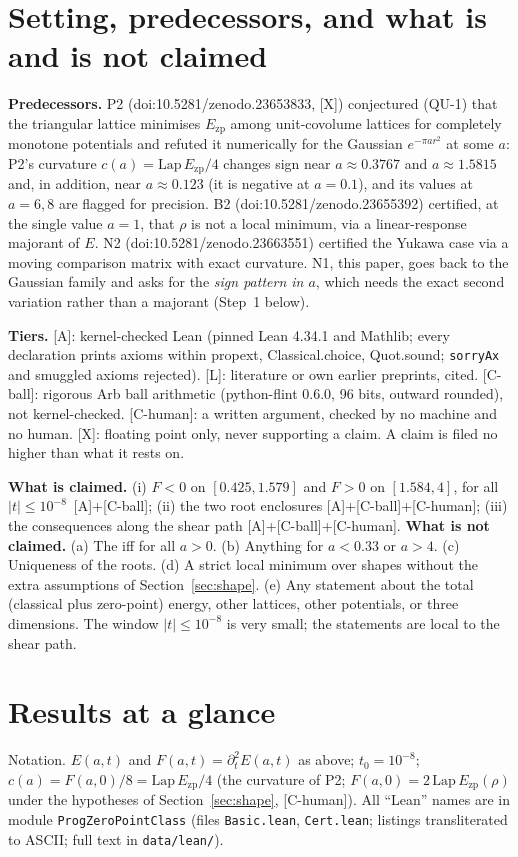 \documentclass[10pt]{article}
\newcommand{\tier}[1]{\textsf{[#1]}}
\newcommand{\tA}{\tier{A}}
\newcommand{\tL}{\tier{L}}
\newcommand{\tX}{\tier{X}}
\newcommand{\tCh}{\tier{C-human}}
\newcommand{\tCb}{\textcolor{blue!60!black}{\textsf{[C-ball]}}}
\newcommand{\lean}[1]{\texttt{#1}}
\renewcommand{\_}{\textunderscore\penalty0\hspace{0pt}}
\newcommand{\Ezp}{E_{\mathrm{zp}}}
\begin{document}
\section{Setting, predecessors, and what is and is not claimed}\label{sec:setting}
\textbf{Predecessors.} P2 (doi:10.5281/zenodo.23653833, \tX) conjectured (QU-1) that the triangular lattice minimises $\Ezp$ among unit-covolume lattices
for completely monotone potentials and refuted it numerically for the Gaussian $e^{-\pi a r^2}$ at some $a$: P2's curvature $c(a)=\mathrm{Lap}\,\Ezp/4$
changes sign near $a\approx0.3767$ and $a\approx1.5815$ and, in addition, near $a\approx0.123$ (it is negative at $a=0.1$), and its values at $a=6,8$ are flagged
for precision. B2 (doi:10.5281/zenodo.23655392) certified, at the single value $a=1$, that $\rho$ is not a local minimum, via a linear-response majorant of $E$.
N2 (doi:10.5281/zenodo.23663551) certified the Yukawa case via a moving comparison matrix with exact curvature. N1, this paper, goes back to the Gaussian family and asks
for the \emph{sign pattern in $a$}, which needs the exact second variation rather than a majorant (Step~1 below).

\textbf{Tiers.} \tA: kernel-checked Lean (pinned Lean 4.34.1 and Mathlib; every declaration prints axioms within propext, Classical.choice, Quot.sound; \lean{sorryAx} and smuggled
axioms rejected). \tL: literature or own earlier preprints, cited. \tCb: rigorous Arb ball arithmetic (python-flint 0.6.0, 96 bits, outward rounded), not kernel-checked.
\tCh: a written argument, checked by no machine and no human. \tX: floating point only, never supporting a claim. A claim is filed no higher than what it rests on.

\textbf{What is claimed.} (i) $F<0$ on $[0.425,1.579]$ and $F>0$ on $[1.584,4]$, for all $|t|\le10^{-8}$ \,\tA{}+\tCb; (ii) the two root enclosures \tA{}+\tCb{}+\tCh; (iii) the
consequences along the shear path \tA{}+\tCb{}+\tCh. \textbf{What is not claimed.} (a) The iff for all $a>0$. (b) Anything for $a<0.33$ or $a>4$. (c) Uniqueness of the roots.
(d) A strict local minimum over shapes without the extra assumptions of Section~\ref{sec:shape}. (e) Any statement about the total (classical plus zero-point) energy, other lattices,
other potentials, or three dimensions. The window $|t|\le10^{-8}$ is very small; the statements are local to the shear path.

\section{Results at a glance}\label{sec:results}
Notation. $E(a,t)$ and $F(a,t)=\partial_t^2E(a,t)$ as above; $t_0=10^{-8}$; $c(a)=F(a,0)/8=\mathrm{Lap}\,\Ezp/4$ (the curvature of P2; $F(a,0)=2\,\mathrm{Lap}\,\Ezp(\rho)$ under the hypotheses of Section~\ref{sec:shape}, \tCh).
All ``Lean'' names are in module \lean{ProgZeroPointClass} (files \texttt{Basic.lean}, \texttt{Cert.lean}; listings transliterated to ASCII; full text in \texttt{data/lean/}).
\end{document}
